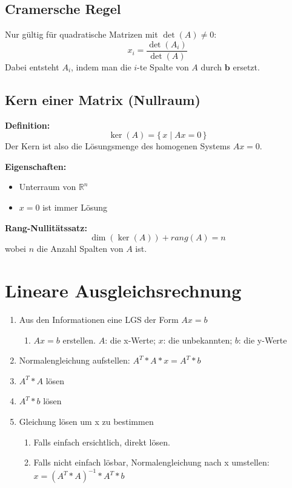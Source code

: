 \documentclass[9pt,a4paper]{article}
\begin{document}
    \subsection{Cramersche Regel}
    Nur gültig für quadratische Matrizen mit $\det(A)\neq 0$:
    \[
    x_i=\frac{\det(A_i)}{\det(A)}
    \]
    Dabei entsteht $A_i$, indem man die $i$-te Spalte von $A$ durch $\mathbf{b}$ ersetzt.
    
    \subsection{Kern einer Matrix (Nullraum)}
    \textbf{Definition:}
    \[
    \ker(A)=\{\,x \mid Ax=0\,\}
    \]
    Der Kern ist also die Lösungsmenge des homogenen Systems $Ax=0$.
    
    \textbf{Eigenschaften:}
    \begin{itemize}
        \item Unterraum von $\mathbb{R}^n$
        \item $x=0$ ist immer Lösung
    \end{itemize}
    
    \textbf{Rang-Nullitätssatz:}
    \[
    \dim(\ker(A)) + rang(A) = n
    \]
    wobei $n$ die Anzahl Spalten von $A$ ist.
    
    \section{Lineare Ausgleichsrechnung}
    \begin{enumerate}
        \item Aus den Informationen eine LGS der Form $Ax=b$
        \begin{enumerate}
            \item $Ax=b$ erstellen. $A$: die x-Werte; $x$: die unbekannten; $b$: die y-Werte
        \end{enumerate}
        \item Normalengleichung aufstellen: $A^T*A*x=A^T*b$
        \item $A^T*A$ lösen
        \item $A^T*b$ lösen
        \item Gleichung lösen um x zu bestimmen
        \begin{enumerate}
            \item Falls einfach ersichtlich, direkt lösen.
            \item Falls nicht einfach lösbar, Normalengleichung nach x umstellen: $x=(A^T*A)^{-1}*A^T*b$
        \end{enumerate}
    \end{enumerate}
    
\end{document}
